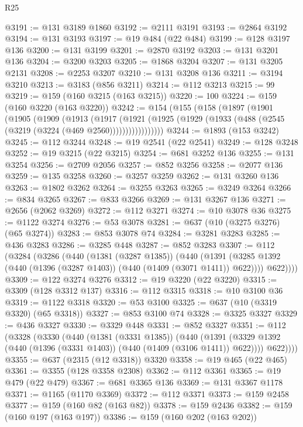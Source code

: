 \begin{lexlean}{R25}
\begin{coremodule}
@3191 := @131 @3189 @1860
@3192 := @2111 @3191
@3193 := @2864 @3192
@3194 := @131 @3193
@3197 := @19 @484 (@22 @484)
@3199 := @128 @3197 @136
@3200 := @131 @3199
@3201 := @2870 @3192
@3203 := @131 @3201 @136
@3204 := @3200 @3203
@3205 := @1868 @3204
@3207 := @131 @3205 @2131
@3208 := @2253 @3207
@3210 := @131 @3208 @136
@3211 := @3194 @3210
@3213 := @3183 (@856 @3211)
@3214 := @112 @3213
@3215 := 99
@3219 := @159 (@160 @3215 (@163 @3215))
@3220 := 100
@3224 := @159 (@160 @3220 (@163 @3220))
@3242 := @154
    (@155
      (@158
        (@1897
          (@1901
            (@1905
              (@1909
                (@1913
                  (@1917
                    (@1921
                      (@1925 (@1929 (@1933 (@488 (@2545 (@3219 (@3224 (@469 @2560)))))))))))))))))
@3244 := @1893 (@153 @3242)
@3245 := @112 @3244
@3248 := @19 @2541 (@22 @2541)
@3249 := @128 @3248
@3252 := @19 @3215 (@22 @3215)
@3254 := @681 @3252 @136
@3255 := @131 @3254
@3256 := @2709 @2056
@3257 := @852 @3256
@3258 := @2077 @136
@3259 := @135 @3258
@3260 := @3257 @3259
@3262 := @131 @3260 @136
@3263 := @1802 @3262
@3264 := @3255 @3263
@3265 := @3249 @3264
@3266 := @834 @3265
@3267 := @833 @3266
@3269 := @131 @3267 @136
@3271 := @2656 (@2062 @3269)
@3272 := @112 @3271
@3274 := @10 @3078 @36
@3275 := @1122 @3274
@3276 := @53 @3078
@3281 := @637 (@10 (@3275 @3276) (@65 @3274))
@3283 := @853 @3078 @74
@3284 := @3281 @3283
@3285 := @436 @3283
@3286 := @3285 @448
@3287 := @852 @3283
@3307 := @112
    (@3284
      (@3286
        (@440
          (@1381 (@3287 @1385))
          (@440
            (@1391 (@3285 @1392 (@440 (@1396 (@3287 @1403)) (@440 (@1409 (@3071 @1411)) @622))))
            @622))))
@3309 := @122 @3274 @3276
@3312 := @19 @3220 (@22 @3220)
@3315 := @3309 (@128 @3312 @137)
@3316 := @112 @3315
@3318 := @10 @3100 @36
@3319 := @1122 @3318
@3320 := @53 @3100
@3325 := @637 (@10 (@3319 @3320) (@65 @3318))
@3327 := @853 @3100 @74
@3328 := @3325 @3327
@3329 := @436 @3327
@3330 := @3329 @448
@3331 := @852 @3327
@3351 := @112
    (@3328
      (@3330
        (@440
          (@1381 (@3331 @1385))
          (@440
            (@1391 (@3329 @1392 (@440 (@1396 (@3331 @1403)) (@440 (@1409 (@3106 @1411)) @622))))
            @622))))
@3355 := @637 (@2315 (@12 @3318)) @3320
@3358 := @19 @465 (@22 @465)
@3361 := @3355 (@128 @3358 @2308)
@3362 := @112 @3361
@3365 := @19 @479 (@22 @479)
@3367 := @681 @3365 @136
@3369 := @131 @3367 @1178
@3371 := @1165 (@1170 @3369)
@3372 := @112 @3371
@3373 := @159 @2458
@3377 := @159 (@160 @82 (@163 @82))
@3378 := @159 @2436
@3382 := @159 (@160 @197 (@163 @197))
@3386 := @159 (@160 @202 (@163 @202))

\end{coremodule}
\end{lexlean}
